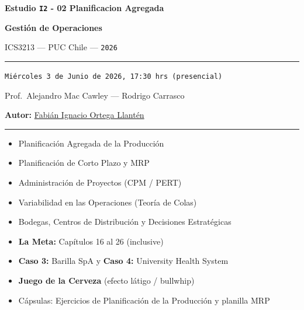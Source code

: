 \documentclass[11pt, a4paper]{article}
\begin{document}
\begin{titlepage}
  \centering
  \vspace*{2cm}
  {\Huge\bfseries\color{gopcyan} Estudio \texttt{I2} - 02 Planificacion Agregada\par}
  \vspace{0.4cm}
  {\LARGE\bfseries Gestión de Operaciones\par}
  \vspace{0.3cm}
  {\large ICS3213 --- PUC Chile --- \texttt{2026}\par}
  \vspace{1.2cm}
  \rule{\textwidth}{0.4pt}
  \vspace{0.4cm}

  {\normalsize \texttt{Miércoles 3 de Junio de 2026, 17:30 hrs (presencial)}\par}
  \vspace{0.2cm}
  {\small Prof.\ Alejandro Mac Cawley --- Rodrigo Carrasco\par}
  \vspace{0.2cm}
  {\small\textbf{Autor:} \href{https://cl.linkedin.com/in/fabian-ortega-llanten}{Fabián Ignacio Ortega Llantén}\par}
  \vspace{0.4cm}
  \rule{\textwidth}{0.4pt}
  \vspace{1cm}

  \begin{resumentemario}
    \begin{itemize}[leftmargin=1.2em, itemsep=2pt]
      \item Planificación Agregada de la Producción
      \item Planificación de Corto Plazo y MRP
      \item Administración de Proyectos (CPM / PERT)
      \item Variabilidad en las Operaciones (Teoría de Colas)
      \item Bodegas, Centros de Distribución y Decisiones Estratégicas
      \item \textbf{La Meta:} Capítulos 16 al 26 (inclusive)
      \item \textbf{Caso 3:} Barilla SpA \quad y \quad \textbf{Caso 4:} University Health System
      \item \textbf{Juego de la Cerveza} (efecto látigo / bullwhip)
      \item Cápsulas: Ejercicios de Planificación de la Producción y planilla MRP
    \end{itemize}
  \end{resumentemario}


\end{titlepage}
\end{document}

